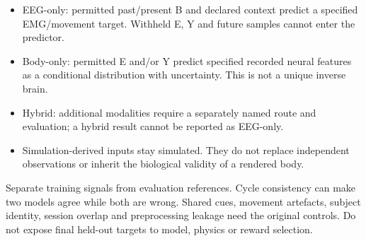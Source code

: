 \begin{itemize}
\item EEG-only: permitted past/present B and declared context predict a specified   EMG/\allowbreak{}movement target. Withheld E, Y and future samples cannot enter the predictor.
\item Body-only: permitted E and/or Y predict specified recorded neural features as   a conditional distribution with uncertainty. This is not a unique inverse brain.
\item Hybrid: additional modalities require a separately named route and evaluation;   a hybrid result cannot be reported as EEG-only.
\item Simulation-derived inputs stay simulated. They do not replace independent   observations or inherit the biological validity of a rendered body.
\end{itemize}

Separate training signals from evaluation references. Cycle consistency can make two models agree while both are wrong. Shared cues, movement artefacts, subject identity, session overlap and preprocessing leakage need the original controls. Do not expose final held-out targets to model, physics or reward selection.

